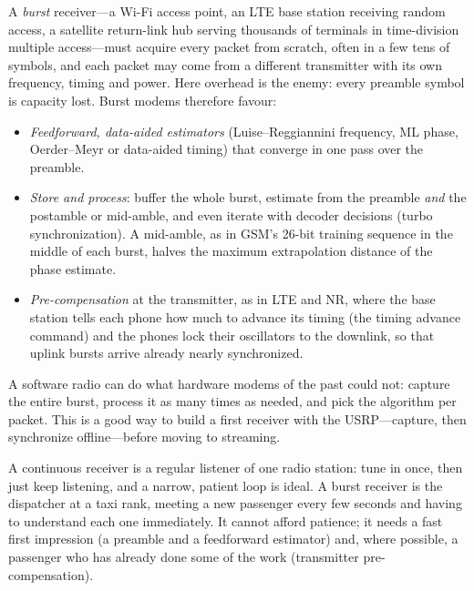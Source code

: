 A \emph{burst} receiver---a Wi-Fi access point, an LTE base station receiving random access, a
satellite return-link hub serving thousands of terminals in time-division multiple access---must
acquire every packet from scratch, often in a few tens of symbols, and each packet may come from a
different transmitter with its own frequency, timing and power. Here overhead is the enemy: every
preamble symbol is capacity lost. Burst modems therefore favour:
\begin{itemize}
\item \emph{Feedforward, data-aided estimators} (Luise--Reggiannini frequency, ML phase,
Oerder--Meyr or data-aided timing) that converge in one pass over the preamble.
\item \emph{Store and process}: buffer the whole burst, estimate from the preamble \emph{and} the
postamble or mid-amble, and even iterate with decoder decisions (turbo synchronization). A
mid-amble, as in GSM's 26-bit training sequence in the middle of each burst, halves the maximum
extrapolation distance of the phase estimate.
\item \emph{Pre-compensation} at the transmitter, as in LTE and NR, where the base station tells each
phone how much to advance its timing (the timing advance command) and the phones lock their
oscillators to the downlink, so that uplink bursts arrive already nearly synchronized.
\end{itemize}
A software radio can do what hardware modems of the past could not: capture the entire burst,
process it as many times as needed, and pick the algorithm per packet. This is a good way to build a
first receiver with the USRP---capture, then synchronize offline---before moving to streaming.

\begin{analogy}
A continuous receiver is a regular listener of one radio station: tune in once, then just keep
listening, and a narrow, patient loop is ideal. A burst receiver is the dispatcher at a taxi rank,
meeting a new passenger every few seconds and having to understand each one immediately. It cannot
afford patience; it needs a fast first impression (a preamble and a feedforward estimator) and,
where possible, a passenger who has already done some of the work (transmitter pre-compensation).
\end{analogy}


